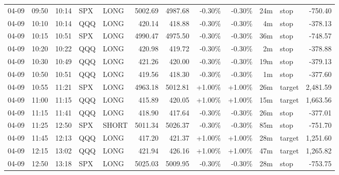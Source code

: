 \documentclass[11pt,a4paper,twoside]{article}
\begin{document}
\begin{center}
\begin{longtable}{>{\color{txtmain}}l l l l l r r r r r >{\color{txtmain}}l r}
04-09 & 09:50 & 10:14 & SPX & LONG & 5002.69 & 4987.68 & \textcolor{lossred}{-0.30\%} & \textcolor{lossred}{-0.30\%} & 24m & stop & \textcolor{lossred}{-750.40} \\
04-09 & 10:10 & 10:14 & QQQ & LONG & 420.14 & 418.88 & \textcolor{lossred}{-0.30\%} & \textcolor{lossred}{-0.30\%} & 4m & stop & \textcolor{lossred}{-378.13} \\
04-09 & 10:15 & 10:51 & SPX & LONG & 4990.47 & 4975.50 & \textcolor{lossred}{-0.30\%} & \textcolor{lossred}{-0.30\%} & 36m & stop & \textcolor{lossred}{-748.57} \\
04-09 & 10:20 & 10:22 & QQQ & LONG & 420.98 & 419.72 & \textcolor{lossred}{-0.30\%} & \textcolor{lossred}{-0.30\%} & 2m & stop & \textcolor{lossred}{-378.88} \\
04-09 & 10:30 & 10:49 & QQQ & LONG & 421.26 & 420.00 & \textcolor{lossred}{-0.30\%} & \textcolor{lossred}{-0.30\%} & 19m & stop & \textcolor{lossred}{-379.13} \\
04-09 & 10:50 & 10:51 & QQQ & LONG & 419.56 & 418.30 & \textcolor{lossred}{-0.30\%} & \textcolor{lossred}{-0.30\%} & 1m & stop & \textcolor{lossred}{-377.60} \\
04-09 & 10:55 & 11:21 & SPX & LONG & 4963.18 & 5012.81 & \textcolor{wingreen}{+1.00\%} & \textcolor{wingreen}{+1.00\%} & 26m & target & \textcolor{wingreen}{2,481.59} \\
04-09 & 11:00 & 11:15 & QQQ & LONG & 415.89 & 420.05 & \textcolor{wingreen}{+1.00\%} & \textcolor{wingreen}{+1.00\%} & 15m & target & \textcolor{wingreen}{1,663.56} \\
04-09 & 11:15 & 11:41 & QQQ & LONG & 418.90 & 417.64 & \textcolor{lossred}{-0.30\%} & \textcolor{lossred}{-0.30\%} & 26m & stop & \textcolor{lossred}{-377.01} \\
04-09 & 11:25 & 12:50 & SPX & SHORT & 5011.34 & 5026.37 & \textcolor{lossred}{-0.30\%} & \textcolor{lossred}{-0.30\%} & 85m & stop & \textcolor{lossred}{-751.70} \\
04-09 & 11:45 & 12:13 & QQQ & LONG & 417.20 & 421.37 & \textcolor{wingreen}{+1.00\%} & \textcolor{wingreen}{+1.00\%} & 28m & target & \textcolor{wingreen}{1,251.60} \\
04-09 & 12:15 & 13:02 & QQQ & LONG & 421.94 & 426.16 & \textcolor{wingreen}{+1.00\%} & \textcolor{wingreen}{+1.00\%} & 47m & target & \textcolor{wingreen}{1,265.82} \\
04-09 & 12:50 & 13:18 & SPX & LONG & 5025.03 & 5009.95 & \textcolor{lossred}{-0.30\%} & \textcolor{lossred}{-0.30\%} & 28m & stop & \textcolor{lossred}{-753.75} \\

\end{longtable}
\end{center}
\end{document}
